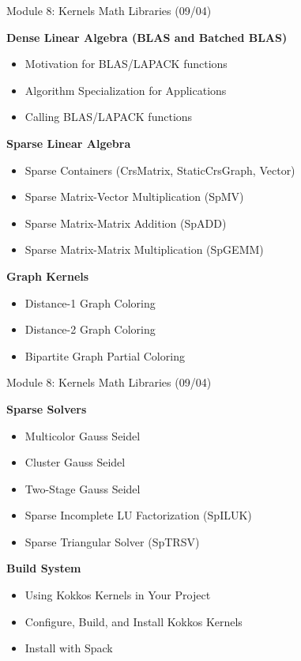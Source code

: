 

\begin{frame}[fragile]{Module 8: Kernels Math Libraries (09/04)}

	\vspace{3pt}
	\textbf{Dense Linear Algebra (BLAS and Batched BLAS)}
	\begin{itemize}
        \item Motivation for BLAS/LAPACK functions
        \item Algorithm Specialization for Applications
        \item Calling BLAS/LAPACK functions
	\end{itemize}

	\vspace{3pt}
	\textbf{Sparse Linear Algebra}
	\begin{itemize}
        \item Sparse Containers (CrsMatrix, StaticCrsGraph, Vector)
        \item Sparse Matrix-Vector Multiplication (SpMV)
        \item Sparse Matrix-Matrix Addition (SpADD)
        \item Sparse Matrix-Matrix Multiplication (SpGEMM)
	\end{itemize}

  \vspace{3pt}
  \textbf{Graph Kernels}
  \begin{itemize}
        \item Distance-1 Graph Coloring
        \item Distance-2 Graph Coloring
        \item Bipartite Graph Partial Coloring
  \end{itemize}

\end{frame}

\begin{frame}[fragile]{Module 8: Kernels Math Libraries (09/04)}

	\vspace{3pt}
	\textbf{Sparse Solvers}
	\begin{itemize}
        \item Multicolor Gauss Seidel
        \item Cluster Gauss Seidel
        \item Two-Stage Gauss Seidel
        \item Sparse Incomplete LU Factorization (SpILUK)
        \item Sparse Triangular Solver (SpTRSV)
	\end{itemize}

	\vspace{3pt}
	\textbf{Build System}
	\begin{itemize}
        \item Using Kokkos Kernels in Your Project
        \item Configure, Build, and Install Kokkos Kernels
        \item Install with Spack
	\end{itemize}

\end{frame}


